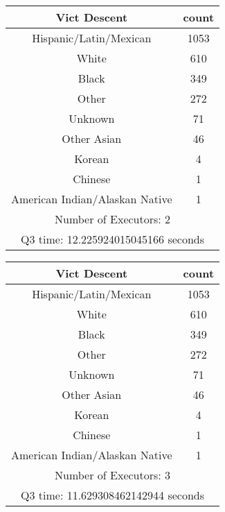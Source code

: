 \documentclass{article}
\begin{document}
\begin{center}
\noindent %
\begin{tabular}[t]{|c|c|}
\hline
\textbf{Vict Descent} & \textbf{count} \\
\hline
Hispanic/Latin/Mexican & 1053 \\
White & 610 \\
Black & 349 \\
Other & 272 \\
Unknown & 71 \\
Other Asian & 46 \\
Korean & 4 \\
Chinese & 1 \\
American Indian/Alaskan Native & 1 \\
\hline
\multicolumn{2}{|c|}{Number of Executors: 2} \\
\multicolumn{2}{|c|}{Q3 time: 12.225924015045166 seconds} \\
\hline
\end{tabular}
\hspace{3mm} %
\begin{tabular}[t]{|c|c|}
\hline
\textbf{Vict Descent} & \textbf{count} \\
\hline
Hispanic/Latin/Mexican & 1053 \\
White & 610 \\
Black & 349 \\
Other & 272 \\
Unknown & 71 \\
Other Asian & 46 \\
Korean & 4 \\
Chinese & 1 \\
American Indian/Alaskan Native & 1 \\
\hline
\multicolumn{2}{|c|}{Number of Executors: 3} \\
\multicolumn{2}{|c|}{Q3 time: 11.629308462142944 seconds} \\
\hline
\end{tabular}
\end{center}

\vspace{3mm} %
\end{document}
